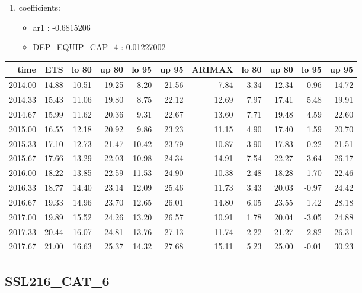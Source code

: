 \documentclass[10pt,a4paper]{article}\usepackage[]{graphicx}\usepackage[]{color}
\newcommand{\AaA}{\_}
\begin{document}
\begin{multicols}{2}
\begin{enumerate}
\item coefficients:
\begin{itemize}
\item  ar1 :  -0.6815206 
\item  DEP\AaA EQUIP\AaA CAP\AaA 4 :  0.01227002 
\end{itemize}
\end{enumerate}
\end{multicols}
\begin{table}[ht]
\centering
\begin{tabular}{rrrrrrrrrrr}
  \hline
time & ETS  & lo 80 & up 80 & lo 95 & up 95 & ARIMAX  & lo 80 & up 80 & lo 95 & up 95 \\ 
  \hline
2014.00 & 14.88 & 10.51 & 19.25 & 8.20 & 21.56 & 7.84 & 3.34 & 12.34 & 0.96 & 14.72 \\ 
  2014.33 & 15.43 & 11.06 & 19.80 & 8.75 & 22.12 & 12.69 & 7.97 & 17.41 & 5.48 & 19.91 \\ 
  2014.67 & 15.99 & 11.62 & 20.36 & 9.31 & 22.67 & 13.60 & 7.71 & 19.48 & 4.59 & 22.60 \\ 
  2015.00 & 16.55 & 12.18 & 20.92 & 9.86 & 23.23 & 11.15 & 4.90 & 17.40 & 1.59 & 20.70 \\ 
  2015.33 & 17.10 & 12.73 & 21.47 & 10.42 & 23.79 & 10.87 & 3.90 & 17.83 & 0.22 & 21.51 \\ 
  2015.67 & 17.66 & 13.29 & 22.03 & 10.98 & 24.34 & 14.91 & 7.54 & 22.27 & 3.64 & 26.17 \\ 
  2016.00 & 18.22 & 13.85 & 22.59 & 11.53 & 24.90 & 10.38 & 2.48 & 18.28 & -1.70 & 22.46 \\ 
  2016.33 & 18.77 & 14.40 & 23.14 & 12.09 & 25.46 & 11.73 & 3.43 & 20.03 & -0.97 & 24.42 \\ 
  2016.67 & 19.33 & 14.96 & 23.70 & 12.65 & 26.01 & 14.80 & 6.05 & 23.55 & 1.42 & 28.18 \\ 
  2017.00 & 19.89 & 15.52 & 24.26 & 13.20 & 26.57 & 10.91 & 1.78 & 20.04 & -3.05 & 24.88 \\ 
  2017.33 & 20.44 & 16.07 & 24.81 & 13.76 & 27.13 & 11.74 & 2.22 & 21.27 & -2.82 & 26.31 \\ 
  2017.67 & 21.00 & 16.63 & 25.37 & 14.32 & 27.68 & 15.11 & 5.23 & 25.00 & -0.01 & 30.23 \\ 
   \hline
\end{tabular}
\end{table}

\newpage
\subsection{SSL216\AaA CAT\AaA 6}
\end{document}
